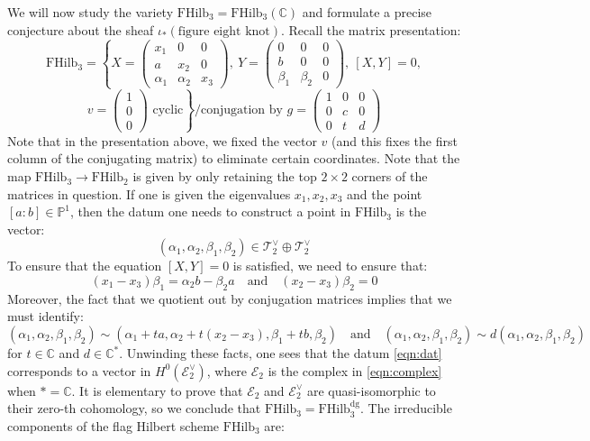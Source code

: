 \documentclass[12pt]{amsart}
\numberwithin{equation}{section}
\theoremstyle{definition}
\theoremstyle{remark}
\newcommand{\CC}{\mathbb{C}}
\newcommand{\PP}{\mathbb{P}}
\newcommand{\CE}{\mathcal{E}}
\newcommand{\CT}{\mathcal{T}}
\renewcommand{\1}{\mathbf{1}}
\newcommand{\FH}{\mathrm{FHilb}}
\newcommand{\dg}{\text{dg}}%
\begin{document}
We will now study the variety $\FH_3 = \FH_3(\CC)$ and formulate a precise conjecture about the sheaf $\iota_*(\text{figure eight knot})$. Recall the matrix presentation:
$$
\FH_3  = \left\{ X = \left( \begin{array}{ccc}
x_1 & 0 & 0 \\
a & x_2 & 0 \\
\alpha_1 & \alpha_2 & x_{3} \end{array} \right), \ Y = \left( \begin{array}{ccc}
0 & 0 & 0 \\
b & 0 & 0 \\
\beta_1 & \beta_2 & 0 \end{array} \right), \ [X,Y]=0, \right.
$$
\begin{equation}
\label{eqn:matrix fh 3}
\left. v = \left( \begin{array}{ccc}
1 \\
0 \\
0 \end{array} \right) \text{ cyclic} \right\} \Big/ \text{conjugation by } g = \left( \begin{array}{ccc}
1 & 0 & 0 \\
0 & c & 0 \\
0 & t & d \end{array} \right)
\end{equation}
Note that in the presentation above, we fixed the vector $v$ (and this fixes the first column of the conjugating matrix) to eliminate certain coordinates. Note that the map $\FH_3 \rightarrow \FH_2$ is given by only retaining the top $2 \times 2$ corners of the matrices in question. If one is given the eigenvalues $x_1,x_2,x_3$ and the point $[a:b] \in \PP^1$, then the datum one needs to construct a point in $\FH_3$ is the vector:
\begin{equation}
\label{eqn:dat}
(\alpha_1, \alpha_2, \beta_1, \beta_2) \in \CT_2^\vee \oplus \CT_2^\vee
\end{equation}
To ensure that the equation $[X,Y]=0$ is satisfied, we need to ensure that: 
$$
(x_1-x_3)\beta_1 = \alpha_2b - \beta_2 a \quad \text{and} \quad (x_2-x_3)\beta_2 = 0
$$
Moreover, the fact that we quotient out by conjugation matrices implies that we must identify:
$$
(\alpha_1, \alpha_2, \beta_1, \beta_2) \sim (\alpha_1 + ta, \alpha_2+t(x_2-x_3), \beta_1 + tb, \beta_2) \quad \text{and} \quad (\alpha_1,\alpha_2,\beta_1,\beta_2) \sim d(\alpha_1,\alpha_2,\beta_1,\beta_2)
$$
for $t \in \CC$ and $d\in \CC^*$. Unwinding these facts, one sees that the datum \eqref{eqn:dat} corresponds to a vector in $H^0(\CE^\vee_2)$, where $\CE_2$ is the complex in \eqref{eqn:complex} when $* = \CC$. It is elementary to prove that $\CE_2$ and $\CE_2^\vee$ are quasi-isomorphic to their zero-th cohomology, so we conclude that $\FH_3 = \FH_3^\dg$. The irreducible components of the flag Hilbert scheme $\FH_3$ are:
\end{document}
